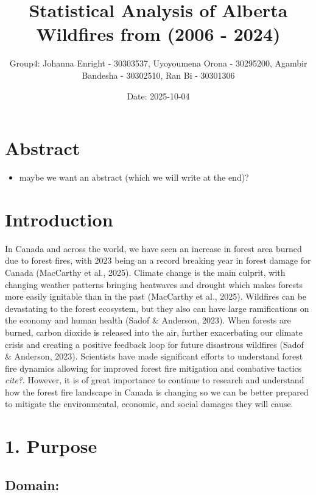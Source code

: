 \documentclass[
]{article}
\title{Statistical Analysis of Alberta Wildfires from (2006 - 2024)}
\author{Group4: Johanna Enright - 30303537, Uyoyoumena Orona - 30295200,
Agambir Bandesha - 30302510, Ran Bi - 30301306}
\date{Date: 2025-10-04}
\providecommand{\tightlist}{%
  \setlength{\itemsep}{0pt}\setlength{\parskip}{0pt}}
\begin{document}
\maketitle

\section{Abstract}\label{abstract}

\begin{itemize}
\tightlist
\item
  maybe we want an abstract (which we will write at the end)?
\end{itemize}

\section{Introduction}\label{introduction}

\indent In Canada and across the world, we have seen an increase in
forest area burned due to forest fires, with 2023 being an a record
breaking year in forest damage for Canada (MacCarthy et al., 2025).
Climate change is the main culprit, with changing weather patterns
bringing heatwaves and drought which makes forests more easily ignitable
than in the past (MacCarthy et al., 2025). Wildfires can be devastating
to the forest ecosystem, but they also can have large ramifications on
the economy and human health (Sadof \& Anderson, 2023). When forests are
burned, carbon dioxide is released into the air, further exacerbating
our climate crisis and creating a positive feedback loop for future
disastrous wildfires (Sadof \& Anderson, 2023). Scientists have made
significant efforts to understand forest fire dynamics allowing for
improved forest fire mitigation and combative tactics \emph{cite?}.
However, it is of great importance to continue to research and
understand how the forest fire landscape in Canada is changing so we can
be better prepared to mitigate the environmental, economic, and social
damages they will cause.

\section{1. Purpose}\label{purpose}

\subsection{Domain:}\label{domain}
\end{document}
